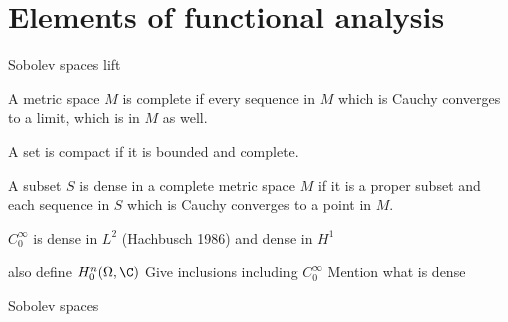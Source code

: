 \section{Elements of functional analysis}



Sobolev spaces lift 



\begin{defn}
\end{defn}

\begin{defn}
	A metric space $M$ is complete if every sequence in $M$
	which is Cauchy converges to a limit, which is in $M$ as well.
\end{defn}

\begin{defn}
	A set is compact if it is bounded and complete.
\end{defn}

\begin{defn}
	A subset $S$ is dense in a complete metric space $M$ if it is a proper subset
	and each sequence in $S$ which is Cauchy converges to a point in $M$.
\end{defn}

$C^\infty_0$ is dense in $L^2$ (Hachbusch 1986)
and dense in $H^1$

also define $H_0^n(\Omega, \C)$
Give inclusions including $C^\infty_0$
Mention what is dense

Sobolev spaces
